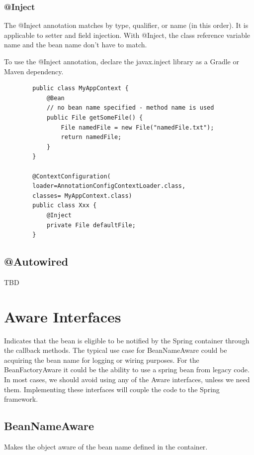 \documentclass{scrartcl}
\begin{document}
\subsubsection{@Inject}

    The @Inject annotation matches by type, qualifier, or name (in this order). It is applicable to setter and field injection. With @Inject, the class reference variable name and the bean name don’t have to match.

    To use the @Inject annotation, declare the javax.inject library as a Gradle or Maven dependency.

    \begin{lstlisting}
        public class MyAppContext {
            @Bean
            // no bean name specified - method name is used
            public File getSomeFile() {
                File namedFile = new File("namedFile.txt");
                return namedFile;
            }
        }

        @ContextConfiguration(
        loader=AnnotationConfigContextLoader.class,
        classes= MyAppContext.class)
        public class Xxx {
            @Inject
            private File defaultFile;
        }
    \end{lstlisting}

\subsection{@Autowired}

TBD

\section{Aware Interfaces}

    Indicates that the bean is eligible to be notified by the Spring container through the callback methods.
    The typical use case for BeanNameAware could be acquiring the bean name for logging or wiring purposes. For the BeanFactoryAware it could be the ability to use a spring bean from legacy code.
    In most cases, we should avoid using any of the Aware interfaces, unless we need them. Implementing these interfaces will couple the code to the Spring framework.

\subsection{BeanNameAware}

    Makes the object aware of the bean name defined in the container.
\end{document}
